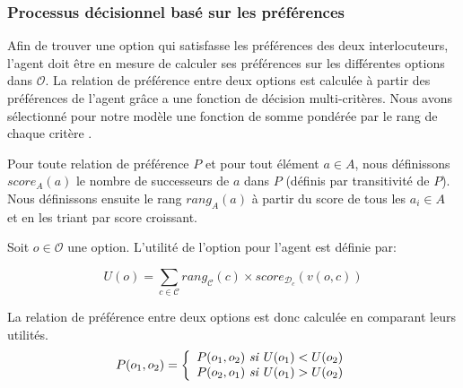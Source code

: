 \documentclass [french]{sig-alternate-05-2015}
\begin{document}


%
%

\subsubsection{Processus décisionnel basé sur les préférences}
Afin de trouver une option qui satisfasse les préférences des deux interlocuteurs, l'agent doit être en mesure de calculer ses préférences sur les différentes options dans $\mathcal{O}$. La relation de préférence entre deux options est calculée à partir des préférences de l'agent grâce a une fonction de décision multi-critères. Nous avons sélectionné pour notre modèle une fonction de somme pondérée par le rang de chaque critère \cite{yager2012ordered}.

Pour toute relation de préférence $P$ et pour tout élément $a\in A$, nous définissons $score_A(a)$ le nombre de successeurs de $a$ dans $P$ (définis par transitivité de $P$). Nous définissons ensuite le rang $rang_A(a)$ à partir du score de tous les $a_i\in A$ et en les triant par score croissant.

Soit $o\in \mathcal{O}$ une option. L'utilité de l'option pour l'agent est définie par:

\[U(o) = \sum_{c \in \mathcal{C}}  rang_{\mathcal{C}}(c) \times score_{\mathcal{D}_c}\left( v(o, c) \right) \] 


\par La relation de préférence entre deux options est donc calculée en comparant leurs utilités. 
\[ P(o_1, o_2)  = \left \{
\begin{array}{l}
P(o_1, o_2)$ \textit{si} $U(o_1) < U(o_2) \\
P(o_2, o_1)$ \textit{si} $U(o_1) > U(o_2) 
\end{array}
\right .\]
\end{document}
